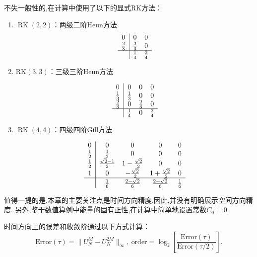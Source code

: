 不失一般性的,在计算中使用了以下的显式RK方法\cite{shuEfficientImplementationEssentially1988}：
\begin{enumerate}
\item $\operatorname{RK}(2,2)$：两级二阶Heun方法%
\begin{equation}
\begin{array}{c|cc}
0 & 0 & 0 \\
\frac{2}{3} & \frac{2}{3} & 0 \\
\hline & \frac{1}{4} & \frac{3}{4}
\end{array}
\end{equation}
	
\item $\mathrm{RK}(3,3)$：三级三阶Heun方法%
	
\begin{equation}
\begin{array}{c|ccc}
0 & 0 & 0 & 0 \\
\frac{1}{3} & \frac{1}{3} & 0 & 0 \\
\frac{2}{3} & 0 & \frac{2}{3} & 0 \\
\hline & \frac{1}{4} & 0 & \frac{3}{4}
\end{array}
\end{equation}
		
\item $\operatorname{RK}(4,4)$：四级四阶Gill方法%
		
\begin{equation}
\begin{array}{c|cccc}
0 & 0 & 0 & 0 & 0 \\
\frac{1}{2} & \frac{1}{2} & 0 & 0 & 0 \\
\frac{1}{2} & \frac{\sqrt{2}-1}{2} & 1-\frac{\sqrt{2}}{2} & 0 & 0 \\
1 & 0 & -\frac{\sqrt{2}}{2} & 1+\frac{\sqrt{2}}{2} & 0 \\
\hline & \frac{1}{6} & \frac{2-\sqrt{2}}{6} & \frac{2+\sqrt{2}}{6} & \frac{1}{6}
\end{array}
\end{equation}
\end{enumerate}

值得一提的是,本章的主要关注点是时间方向精度.因此,并没有明确展示空间方向精度.
另外,鉴于数值算例中能量的固有正性,在计算中简单地设置常数$C_0=0$.

时间方向上的误差和收敛阶通过以下方式计算：
\begin{equation}
	\text{Error}(\tau) = \|U_{N}^{M} - U_{N}^{2 M}\|_{\infty},~\text{order} = \log_{2}\left[\frac{\text{Error}(\tau)}{\text{Error}(\tau / 2)}\right].\label{eq_SAVRRK:104}
\end{equation}

